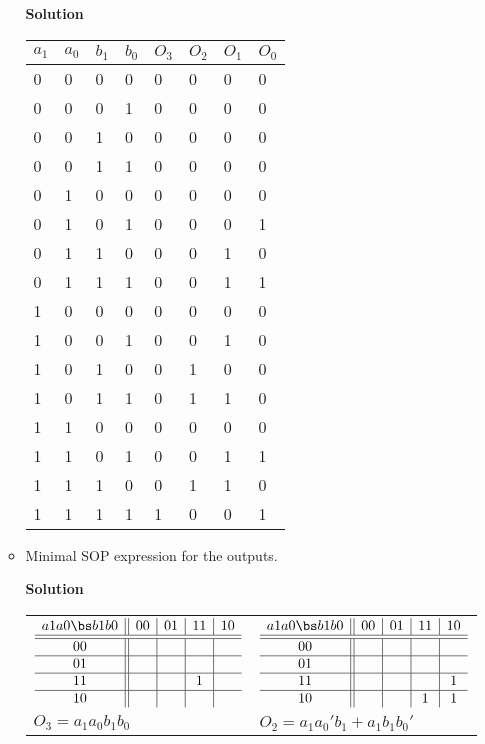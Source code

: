 \begin{enumerate}
\begin{itemize}
\begin{onlysolution}  \textbf{Solution} \itshape{
\begin{tabular}{l|l|l|l||l|l|l|l}
$a_1$ & $a_0$ & $b_1$ & $b_0$ & $O_3$ & $O_2$ & $O_1$ & $O_0$ \\ \hline
0&0&0&0 &0&0&0&0 \\ \hline
0&0&0&1 &0&0&0&0 \\ \hline
0&0&1&0 &0&0&0&0 \\ \hline
0&0&1&1 &0&0&0&0 \\ \hline
0&1&0&0 &0&0&0&0 \\ \hline
0&1&0&1 &0&0&0&1 \\ \hline
0&1&1&0 &0&0&1&0 \\ \hline
0&1&1&1 &0&0&1&1 \\ \hline
1&0&0&0 &0&0&0&0 \\ \hline
1&0&0&1 &0&0&1&0 \\ \hline
1&0&1&0 &0&1&0&0 \\ \hline
1&0&1&1 &0&1&1&0 \\ \hline
1&1&0&0 &0&0&0&0 \\ \hline
1&1&0&1 &0&0&1&1 \\ \hline
1&1&1&0 &0&1&1&0 \\ \hline
1&1&1&1 &1&0&0&1 \\
\end{tabular}
} \end{onlysolution} 

\item Minimal SOP expression for the outputs.

\begin{onlysolution}  \textbf{Solution} \itshape{
\begin{tabular}{ll}
$\begin{array} {c||c|c|c|c}
 a1 a0 \bs b1 b0 & 00 & 01 & 11 & 10 \\ \hline \hline
       00        &    &    &    &    \\ \hline
       01        &    &    &    &    \\ \hline
       11        &    &    & 1  &    \\ \hline
       10        &    &    &    &    \\
\end{array}$ &
$\begin{array} {c||c|c|c|c}
 a1 a0 \bs b1 b0 & 00 & 01 & 11 & 10 \\ \hline \hline
       00        &    &    &    &    \\ \hline
       01        &    &    &    &    \\ \hline
       11        &    &    &    & 1  \\ \hline
       10        &    &    & 1  & 1  \\
\end{array} $ \\
$O_3 = a_1a_0b_1b_0$ & $O_2 = a_1a_0'b_1 + a_1b_1b_0'$\\
\end{tabular}
} \end{onlysolution} 



\end{itemize}
\end{enumerate}
